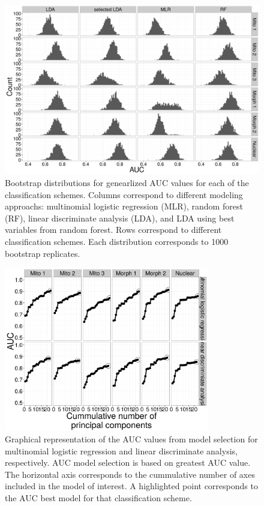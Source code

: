 \documentclass[12pt,letterpaper]{article}
\begin{document}
\begin{figure}[ht]
  \centering
  \includegraphics[height = 0.8\textheight, width = \textwidth, keepaspectratio = true]{figure/gen_res}
  \caption{Bootstrap distributions for genearlized AUC values for each of the classification schemes. Columns correspond to different modeling approachs: multinomial logistic regression (MLR), random forest (RF), linear discriminate analysis (LDA), and LDA using best variables from random forest. Rows correspond to different classification schemes. Each distribution corresponds to 1000 bootstrap replicates.}
  \label{fig:gen_hist}
\end{figure}

\begin{figure}[ht]
  \centering
  \includegraphics[height = 0.8\textheight, width = 0.8\textwidth, keepaspectratio = true]{figure/sel_val}
  \caption{Graphical representation of the AUC values from model selection for multinomial logistic regression and linear discriminate analysis, respectively. AUC model selection is based on greatest AUC value. The horizontal axis corresponds to the cummulative number of axes included in the model of interest. A highlighted point corresponds to the AUC best model for that classification scheme.}
  \label{fig:sel}
\end{figure}
\end{document}
